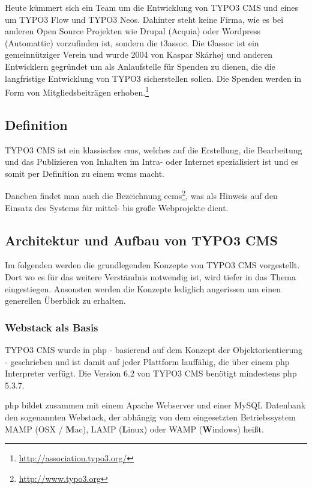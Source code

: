 Heute kümmert sich ein Team um die Entwicklung von TYPO3 CMS und eines um TYPO3 Flow und TYPO3 Neos. Dahinter steht keine Firma, wie es bei anderen Open Source Projekten wie Drupal (Acquia) oder Wordpress (Automattic) vorzufinden ist, sondern die \gls{t3assoc}. Die \gls{t3assoc} ist ein gemeinnütziger Verein und wurde 2004 von Kaspar Skårhøj und anderen Entwicklern gegründet um als Anlaufstelle für Spenden zu dienen, die die langfristige Entwicklung von TYPO3 sicherstellen sollen. Die Spenden werden in Form von Mitgliedsbeiträgen erhoben.\footnote{\url{http://association.typo3.org/}}

\subsection{Definition}
TYPO3 CMS ist ein klassisches \gls{cms}, welches auf die Erstellung, die Bearbeitung und das Publizieren von Inhalten im Intra- oder Internet spezialisiert ist und es somit per Definition zu einem \gls{wcms} macht.

Daneben findet man auch die Bezeichnung \gls{ecms}\footnote{\url{http://www.typo3.org}}, was als Hinweis auf den Einsatz des Systems für mittel- bis große Webprojekte dient.

\subsection{Architektur und Aufbau von TYPO3 CMS}
\label{subsec:architectureTypo3}
Im folgenden werden die grundlegenden Konzepte von TYPO3 CMS vorgestellt. Dort wo es für das weitere Verständnis notwendig ist, wird tiefer in das Thema eingestiegen. Ansonsten werden die Konzepte lediglich angerissen um einen generellen Überblick zu erhalten.

\subsubsection{Webstack als Basis}

TYPO3 CMS wurde in \gls{php} - basierend auf dem Konzept der Objektorientierung - geschrieben und ist damit auf jeder Plattform lauffähig, die über einem \gls{php} Interpreter verfügt. Die Version 6.2 von TYPO3 CMS benötigt mindestens \gls{php} 5.3.7.

\gls{php} bildet zusammen mit einem Apache Webserver und einer MySQL Datenbank den sogenannten Webstack, der abhängig von dem eingesetzten Betriebssystem MAMP (OSX / {\bfseries M}ac), LAMP ({\bfseries L}inux) oder WAMP ({\bfseries W}indows) heißt.

